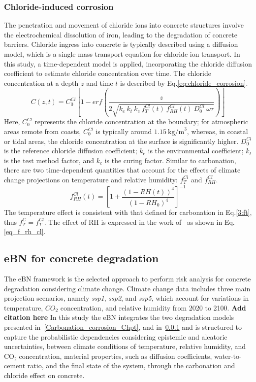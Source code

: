 \subsubsection{Chloride-induced corrosion}\label{Chloride_corrosion_Chpt}
The penetration and movement of chloride ions into concrete structures involve the electrochemical dissolution of iron, leading to the degradation of concrete barriers.
Chloride ingress into concrete is typically described using a diffusion model, which is a single mass transport equation for chloride ion transport.
In this study, a time-dependent model is applied, incorporating the chloride diffusion coefficient to estimate chloride concentration over time. The chloride concentration at a depth $z$ and time $t$ is described by Eq.\ref{eq:chloride_corrosion}.
\begin{equation}
    \label{eq:chloride_corrosion}
    C(z, t) = C_0^{Cl} \left[ 1-erf \left(\frac{z}{2\sqrt{k_e \ k_t \ k_c \ f_T^{Cl}(t) \ f_{RH}^{Cl}(t) \ D_0^{Cl} \ \omega \tau}} \right) \right]
\end{equation}
Here, $C_0^{Cl}$ represents the chloride concentration at the boundary; for atmospheric areas remote from coasts, $C_0^{Cl}$ is typically around $1.15 \ \text{kg/m}^3$, whereas, in coastal or tidal areas, the chloride concentration at the surface is significantly higher. $D_0^{Cl}$ is the reference chloride diffusion coefficient; $k_e$ is the environmental coefficient; $k_t$ is the test method factor, and $k_c$ is the curing factor. 
Similar to carbonation, there are two time-dependent quantities that account for the effects of climate change projections on temperature and relative humidity: $f_{T}^{Cl}$ and $f_{RH}^{Cl}$.
\begin{equation}
    \label{eq_f_rh_cl}
    f_{RH}^{Cl}(t) = \left[ 1 + \frac{(1-RH(t))^4}{(1-RH_0)^4} \right]^{-1}
\end{equation}
The temperature effect is consistent with that defined for carbonation in Eq.\ref{3:ft}, thus $f_T^C = f_T^{Cl}$. The effect of RH is expressed in the work of~\textcite{f_RH_ClELHASSAN} as shown in Eq.\ref{eq_f_rh_cl}.

\subsection{eBN for concrete degradation}
The eBN framework is the selected approach to perform risk analysis for concrete degradation considering climate change. Climate change data includes three main projection scenarios, namely \textit{ssp1}, \textit{ssp2}, and \textit{ssp5}, which account for variations in temperature, $CO_2$ concentration, and relative humidity from 2020 to 2100. \textbf{{{Add citation here}}}  
In this study the eBN integrates the two degradation models presented in~\ref{Carbonation_corrosion_Chpt}, and in~\ref{Chloride_corrosion_Chpt} and is structured to capture the probabilistic dependencies considering epistemic and aleatoric uncertainties, between climate conditions of temperature, relative humidity, and CO₂ concentration, material properties, such as diffusion coefficients, water-to-cement ratio, and the final state of the system, through the carbonation and chloride effect on concrete.


